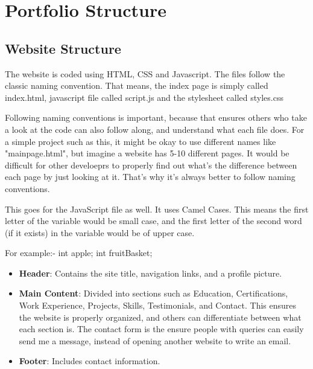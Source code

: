 \documentclass[15pt]{report}
\begin{document}
\chapter{Portfolio Structure}

\section{Website Structure}

The website is coded using HTML, CSS and Javascript. The files follow the classic naming convention. That means, the index page is simply called index.html, javascript file called script.js and the stylesheet called styles.css

Following naming conventions is important, because that ensures others who take a look at the code can also follow along, and understand what each file does. For a simple project such as this, it might be okay to use different names like "mainpage.html", but imagine a website has 5-10 different pages. It would be difficult for other develoeprs to properly find out what's the difference between each page by just looking at it. That's why it's always better to follow naming conventions.

This goes for the JavaScript file as well. It uses Camel Cases. This means the first letter of the variable would be small case, and the first letter of the second word (if it exists) in the variable would be of upper case. 

For example:- 
        int apple;
        int fruitBasket;
        

\begin{itemize}

    \item \textbf{Header}: Contains the site title, navigation links, and a profile picture.

    \item \textbf{Main Content}: Divided into sections such as Education, Certifications, Work Experience, Projects, Skills, Testimonials, and Contact. This ensures the website is properly organized, and others can differentiate between what each section is. The contact form is the ensure people with queries can easily send me a message, instead of opening another website to write an email. 
    
    \item \textbf{Footer}: Includes contact information.
    
\end{itemize}
\end{document}

